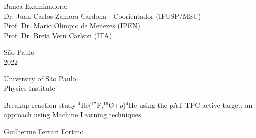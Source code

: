 \documentclass[a4paper,12pt,oneside]{book}
\begin{document}
\par
\leftskip 6cm
\par
\leftskip 0cm
\vskip 2cm


\noindent Banca Examinadora: \\
\noindent Dr. Juan Carlos Zamora Cardona - Coorientador (IFUSP/MSU) \\
Prof. Dr. Mario Olimpio de Menezes (IPEN) \\
Prof. Dr. Brett Vern Carlson (ITA) \\
\vspace{1.8cm}


\begin{center}
    {S\~ao Paulo \\  2022}
\end{center}%
\newpage


\newpage
\thispagestyle{empty}
\begin{center}

	{\fontsize{16}{16} \selectfont University of São Paulo \\}
	\vspace{0.1cm}
	{\fontsize{16}{16} \selectfont Physics Institute}
    \vspace{2.2cm}

	{\fontsize{22}{22}\selectfont Breakup reaction study $^4$He($^{17}$F,$^{16}$O+$p$)$^4$He using the pAT-TPC active target: an approach using Machine Learning techniques\par}
    \vspace{2cm}


    {\fontsize{18}{18}\selectfont Guilherme Ferrari Fortino\par}

    \vspace{1.4cm}

\end{center}
\end{document}
